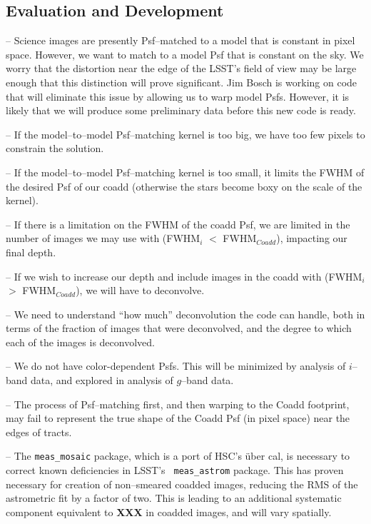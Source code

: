 \documentclass[prd, nofootinbib, floatfix, 11pt,tightenlines,times]{article}
\begin{document}
\subsection{Evaluation and Development}

-- Science images are presently Psf--matched to a model that is constant in pixel space.
However, we want to match to a model Psf that is constant on the sky. We worry that the
distortion near the edge of the LSST's field of view may be large enough
that this distinction will prove significant. Jim Bosch is working on code
that will eliminate this issue by allowing us to warp model Psfs.
However, it is likely that we will produce some preliminary data before this new code is ready.

-- If the model--to--model Psf--matching kernel is too big, we have
too few pixels to constrain the solution.

-- If the model--to--model Psf--matching kernel is too small, it
limits the FWHM of the desired Psf of our coadd (otherwise the stars
become boxy on the scale of the kernel).

-- If there is a limitation on the FWHM of the coadd Psf, we are
limited in the number of images we may use with (FWHM$_i$ $<$
FWHM$_{Coadd}$), impacting our final depth.

-- If we wish to increase our depth and include images in the coadd
with (FWHM$_i$ $>$ FWHM$_{Coadd}$), we will have to deconvolve.

-- We need to understand ``how much'' deconvolution the code can handle,
both in terms of the fraction of images that were deconvolved, and the
degree to which each of the images is deconvolved.

-- We do not have color-dependent Psfs.  This will be minimized by
analysis of $i$--band data, and explored in analysis of $g$--band
data.

-- The process of Psf--matching first, and then warping to the Coadd
footprint, may fail to represent the true shape of the Coadd Psf (in
pixel space) near the edges of tracts.

-- The {\tt meas\_mosaic} package, which is a port of HSC's \"{u}ber
cal, is necessary to correct known deficiencies in LSST's {\tt
  meas\_astrom} package.  This has proven necessary for creation of
non--smeared coadded images, reducing the RMS of the astrometric fit
by a factor of two.  This is leading to an additional systematic
component equivalent to {\bf XXX} in coadded images, and will vary
spatially.
\end{document}
